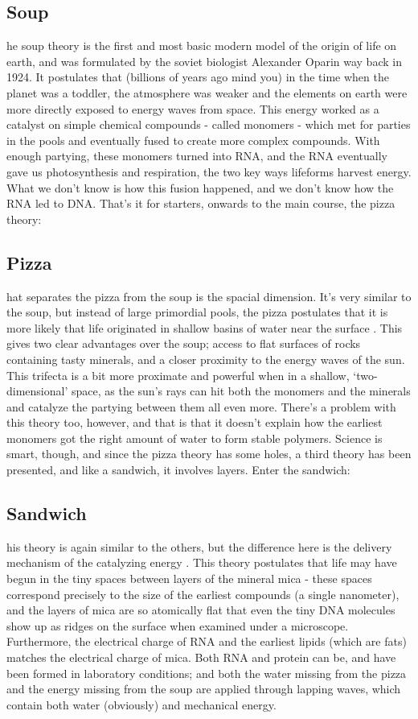 \subsection{Soup}
he soup theory is the first and most basic modern model of the origin of life on earth, and was formulated by the soviet biologist Alexander Oparin way back in 1924. It postulates \cite{shapiro} that (billions of years ago mind you) in the time when the planet was a toddler, the atmosphere was weaker and the elements on earth were more directly exposed to energy waves from space. This energy worked as a catalyst on simple chemical compounds - called monomers - which met for parties in the pools and eventually fused to create more complex compounds. With enough partying, these monomers turned into RNA, and the RNA eventually gave us photosynthesis and respiration, the two key ways lifeforms harvest energy. What we don’t know is how this fusion happened, and we don’t know how the RNA led to DNA. That’s it for starters, onwards to the main course, the pizza theory: 

\subsection{Pizza}
hat separates the pizza from the soup is the spacial dimension. It’s very similar to the soup, but instead of large primordial pools, the pizza postulates that it is more likely that life originated in shallow basins of water near the surface \cite{Exoboken}. This gives two clear advantages over the soup; access to flat surfaces of rocks containing tasty minerals, and a closer proximity to the energy waves of the sun. This trifecta is a bit more proximate and powerful when in a shallow, ‘two-dimensional’ space, as the sun’s rays can hit both the monomers and the minerals and catalyze the partying between them all even more. There’s a problem with this theory too, however, and that is that it doesn’t explain how the earliest monomers got the right amount of water to form stable polymers. Science is smart, though, and since the pizza theory has some holes, a third theory has been presented, and like a sandwich, it involves layers. Enter the sandwich:

\subsection{Sandwich}
his theory is again similar to the others, but the difference here is the delivery mechanism of the catalyzing energy \cite{szosa}. This theory postulates that life may have begun in the tiny spaces between layers of the mineral mica - these spaces correspond precisely to the size of the earliest compounds (a single nanometer), and the layers of mica are so atomically flat that even the tiny DNA molecules show up as ridges on the surface when examined under a microscope. Furthermore, the electrical charge of RNA and the earliest lipids (which are fats) matches the electrical charge of mica. Both RNA and protein can be, and have been formed in laboratory conditions; and both the water missing from the pizza and the energy missing from the soup are applied through lapping waves, which contain both water (obviously) and mechanical energy. 